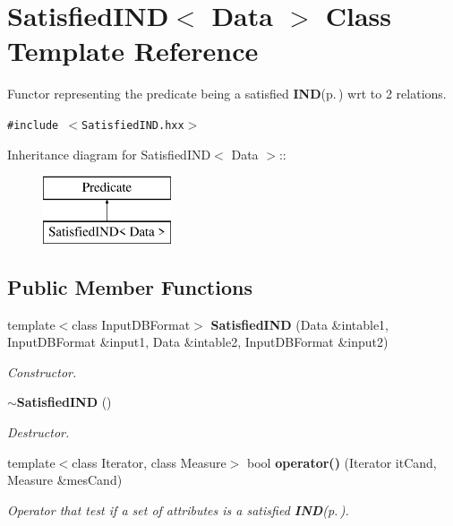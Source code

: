 \section{Satisfied\-IND$<$ Data $>$ Class Template Reference}
\label{class_satisfied_i_n_d}
Functor representing the predicate being a satisfied {\bf IND}{\rm (p.\,\pageref{class_i_n_d})} wrt to 2 relations.  


{\tt \#include $<$Satisfied\-IND.hxx$>$}

Inheritance diagram for Satisfied\-IND$<$ Data $>$::\begin{figure}[H]
\begin{center}
\leavevmode
\includegraphics[height=2cm]{class_satisfied_i_n_d}
\end{center}
\end{figure}
\subsection*{Public Member Functions}
\begin{CompactItemize}
\item 
template$<$class Input\-DBFormat$>$ {\bf Satisfied\-IND} (Data \&intable1, Input\-DBFormat \&input1, Data \&intable2, Input\-DBFormat \&input2)
\begin{CompactList}\small\item\em Constructor. \item\end{CompactList}\item 
{\bf $\sim$Satisfied\-IND} ()\label{class_satisfied_i_n_d_42ee5fbb4365e4ebaa5b6d2811cd90a5}

\begin{CompactList}\small\item\em Destructor. \item\end{CompactList}\item 
template$<$class Iterator, class Measure$>$ bool {\bf operator()} (Iterator it\-Cand, Measure \&mes\-Cand)
\begin{CompactList}\small\item\em Operator that test if a set of attributes is a satisfied {\bf IND}{\rm (p.\,\pageref{class_i_n_d})}. \item\end{CompactList}\end{CompactItemize}
